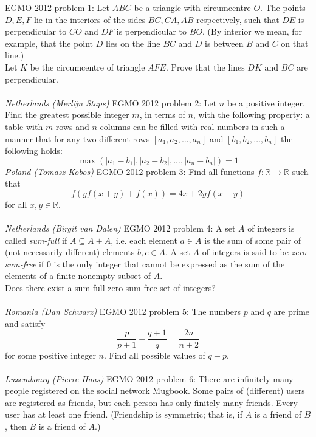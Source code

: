 EGMO 2012 problem 1:  Let $ABC$ be a triangle with circumcentre $O$. The points $D,E,F$ lie in the interiors of the sides $BC,CA,AB$ respectively, such that $DE$ is perpendicular to $CO$ and $DF$ is perpendicular to $BO$. (By interior we mean, for example, that the point $D$ lies on the line $BC$ and $D$ is between $B$ and $C$ on that line.) \\
Let $K$ be the circumcentre of triangle $AFE$. Prove that the lines $DK$ and $BC$ are perpendicular. \\\\
\textit{Netherlands (Merlijn Staps)} 
EGMO 2012 problem 2:  Let $n$ be a positive integer. Find the greatest possible integer $m$, in terms of $n$, with the following property: a table with $m$ rows and $n$ columns can be filled with real numbers in such a manner that for any two different rows $\left[ {{a_1},{a_2},\ldots,{a_n}}\right]$ and $\left[ {{b_1},{b_2},\ldots,{b_n}} \right]$ the following holds:
\[
\max\left( {\left| {{a_1} - {b_1}} \right|,\left| {{a_2} - {b_2}} \right|,...,\left| {{a_n} - {b_n}} \right|} \right) = 1
\]
\textit{Poland (Tomasz Kobos)} 
EGMO 2012 problem 3:  Find all functions $f:\mathbb{R}\to\mathbb{R}$ such that
\[ f\left( {yf(x + y) + f(x)} \right) = 4x + 2yf(x + y) \]
for all $x,y\in\mathbb{R}$. \\\\
\textit{Netherlands (Birgit van Dalen)} 
EGMO 2012 problem 4:  A set $A$ of integers is called \textit{sum-full} if $A \subseteq A + A$, i.e. each element $a \in A$ is the sum of some pair of (not necessarily different) elements $b,c \in A$. A set $A$ of integers is said to be \textit{zero-sum-free} if $0$ is the only integer that cannot be expressed as the sum of the elements of a finite nonempty subset of $A$. \\
Does there exist a sum-full zero-sum-free set of integers? \\\\
\textit{Romania (Dan Schwarz)} 
EGMO 2012 problem 5:  The numbers $p$ and $q$ are prime and satisfy
\[ \frac{p}{{p + 1}} + \frac{{q + 1}}{q} = \frac{{2n}}{{n + 2}} \]
for some positive integer $n$. Find all possible values of $q-p$. \\\\
\textit{Luxembourg (Pierre Haas)} 
EGMO 2012 problem 6:  There are infinitely many people registered on the social network Mugbook. Some pairs of (different) users are registered as friends, but each person has only finitely many friends. Every user has at least one friend. (Friendship is symmetric; that is, if $A$ is a friend of $B$, then $B$ is a friend of $A$.) \\
